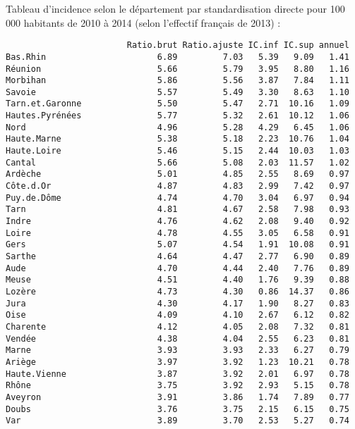 \documentclass[11pt,a4paper]{article}\usepackage[]{graphicx}\usepackage[]{color}
\makeatletter
\newenvironment{kframe}{%
 \def\at@end@of@kframe{}%
 \ifinner\ifhmode%
  \def\at@end@of@kframe{\end{minipage}}%
  \begin{minipage}{\columnwidth}%
 \fi\fi%
 \def\FrameCommand##1{\hskip\@totalleftmargin \hskip-\fboxsep
 \colorbox{shadecolor}{##1}\hskip-\fboxsep
     \hskip-\linewidth \hskip-\@totalleftmargin \hskip\columnwidth}%
 \MakeFramed {\advance\hsize-\width
   \@totalleftmargin\z@ \linewidth\hsize
   \@setminipage}}%
 {\par\unskip\endMakeFramed%
 \at@end@of@kframe}
\newenvironment{knitrout}{}{} %
\makeatother
\begin{document}
Tableau d'incidence selon le département par standardisation directe pour 100 000 habitants de 2010 à 2014 (selon l'effectif français de 2013) :
\begin{knitrout}
\color{fgcolor}\begin{kframe}
\begin{verbatim}
                        Ratio.brut Ratio.ajuste IC.inf IC.sup annuel
Bas.Rhin                      6.89         7.03   5.39   9.09   1.41
Réunion                       5.66         5.79   3.95   8.80   1.16
Morbihan                      5.86         5.56   3.87   7.84   1.11
Savoie                        5.57         5.49   3.30   8.63   1.10
Tarn.et.Garonne               5.50         5.47   2.71  10.16   1.09
Hautes.Pyrénées               5.77         5.32   2.61  10.12   1.06
Nord                          4.96         5.28   4.29   6.45   1.06
Haute.Marne                   5.38         5.18   2.23  10.76   1.04
Haute.Loire                   5.46         5.15   2.44  10.03   1.03
Cantal                        5.66         5.08   2.03  11.57   1.02
Ardèche                       5.01         4.85   2.55   8.69   0.97
Côte.d.Or                     4.87         4.83   2.99   7.42   0.97
Puy.de.Dôme                   4.74         4.70   3.04   6.97   0.94
Tarn                          4.81         4.67   2.58   7.98   0.93
Indre                         4.76         4.62   2.08   9.40   0.92
Loire                         4.78         4.55   3.05   6.58   0.91
Gers                          5.07         4.54   1.91  10.08   0.91
Sarthe                        4.64         4.47   2.77   6.90   0.89
Aude                          4.70         4.44   2.40   7.76   0.89
Meuse                         4.51         4.40   1.76   9.39   0.88
Lozère                        4.73         4.30   0.86  14.37   0.86
Jura                          4.30         4.17   1.90   8.27   0.83
Oise                          4.09         4.10   2.67   6.12   0.82
Charente                      4.12         4.05   2.08   7.32   0.81
Vendée                        4.38         4.04   2.55   6.23   0.81
Marne                         3.93         3.93   2.33   6.27   0.79
Ariège                        3.97         3.92   1.23  10.21   0.78
Haute.Vienne                  3.87         3.92   2.01   6.97   0.78
Rhône                         3.75         3.92   2.93   5.15   0.78
Aveyron                       3.91         3.86   1.74   7.89   0.77
Doubs                         3.76         3.75   2.15   6.15   0.75
Var                           3.89         3.70   2.53   5.27   0.74

\end{verbatim}
\end{kframe}
\end{knitrout}
\end{document}
